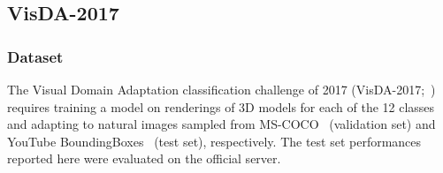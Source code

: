 \documentclass[runningheads]{llncs}
\begin{document}
\begin{table}[t]
\centering
\caption{Performance of DeepJDOT on the Office-Home dataset. ``Ar'' = artistic paintings, ``Cl'' = clipart, ``Pr'' = product, ``Rw'' = real-world images. Performance figures of competitive methods are reported from~\cite{venkateswara2017}.} \label{tab:office}\vspace{-0.1cm}
\scriptsize{
}
\end{table} 







\subsection{VisDA-2017}\label{sec:visda}

\subsubsection*{Dataset} The Visual Domain Adaptation classification challenge of 2017 (VisDA-2017;~\cite{visda2017}) requires training a model on renderings of 3D models for each of the 12 classes and adapting to natural images sampled from MS-COCO~\cite{lin2014microsoft} (validation set) and YouTube BoundingBoxes~\cite{real2017youtube} (test set), respectively. The test set performances reported here were evaluated on the official server.
\end{document}
